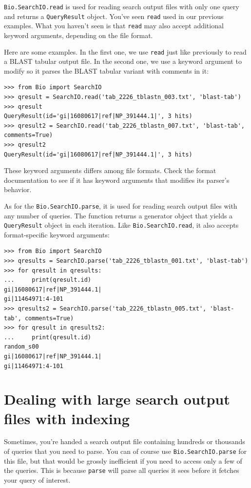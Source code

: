 \documentclass{report}
\begin{document}
\verb|Bio.SearchIO.read| is used for reading search output files with only one
query and returns a \verb|QueryResult| object. You've seen \verb|read| used in
our previous examples. What you haven't seen is that \verb|read| may also accept
additional keyword arguments, depending on the file format.

Here are some examples. In the first one, we use \verb|read| just like
previously to read a BLAST tabular output file. In the second one, we use a
keyword argument to modify so it parses the BLAST tabular variant with comments
in it:

\begin{verbatim}
>>> from Bio import SearchIO
>>> qresult = SearchIO.read('tab_2226_tblastn_003.txt', 'blast-tab')
>>> qresult
QueryResult(id='gi|16080617|ref|NP_391444.1|', 3 hits)
>>> qresult2 = SearchIO.read('tab_2226_tblastn_007.txt', 'blast-tab', comments=True)
>>> qresult2
QueryResult(id='gi|16080617|ref|NP_391444.1|', 3 hits)
\end{verbatim}

These keyword arguments differs among file formats. Check the format
documentation to see if it has keyword arguments that modifies its parser's
behavior.

As for the \verb|Bio.SearchIO.parse|, it is used for reading search output
files with any number of queries. The function returns a generator object that
yields a \verb|QueryResult| object in each iteration. Like
\verb|Bio.SearchIO.read|, it also accepts format-specific keyword arguments:

\begin{verbatim}
>>> from Bio import SearchIO
>>> qresults = SearchIO.parse('tab_2226_tblastn_001.txt', 'blast-tab')
>>> for qresult in qresults:
...     print(qresult.id)
gi|16080617|ref|NP_391444.1|
gi|11464971:4-101
>>> qresults2 = SearchIO.parse('tab_2226_tblastn_005.txt', 'blast-tab', comments=True)
>>> for qresult in qresults2:
...     print(qresult.id)
random_s00
gi|16080617|ref|NP_391444.1|
gi|11464971:4-101
\end{verbatim}

\section{Dealing with large search output files with indexing}
\label{sec:searchio-index}

Sometimes, you're handed a search output file containing hundreds or thousands
of queries that you need to parse. You can of course use
\verb|Bio.SearchIO.parse| for this file, but that would be grossly inefficient
if you need to access only a few of the queries. This is because \verb|parse|
will parse all queries it sees before it fetches your query of interest.
\end{document}

